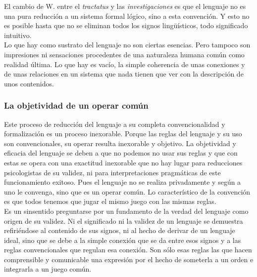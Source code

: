\documentclass[a4paper, 11pt, twocolumn, spanish]{article}
\begin{document}
El cambio de W. entre el \emph{tractatus} y las \emph{investigaciones} es que el
lenguaje no es una pura reducción a un sistema formal lógico, sino a
esta convención. Y esto no es posible hasta que no se eliminan todos
los signos lingüísticos, todo significado intuitivo.\\
Lo que hay como sustrato del lenguaje no son ciertas esencias. Pero
tampoco son impresiones ni sensaciones procedentes de una naturaleza
humana común como realidad última. Lo que hay es vacío, la simple
coherencia de unas conexiones y de unas relaciones en un sistema que
nada tienen que ver con la descripción de unos contenidos.

\subsubsection{La objetividad de un operar común}
\label{sec:orgbc5586d}
Este proceso de reducción del lenguaje a su completa convencionalidad
y formalización es un proceso inexorable. Porque las reglas del
lenguaje y su uso son convencionales, su operar resulta inexorable y
objetivo. La objetividad y eficacia del lenguaje se deben a que no
podemos no usar sus reglas y que con estas se opera con una exactitud
inexorable que no hay lugar para reducciones psicologistas de su
validez, ni para interpretaciones pragmáticas de este funcionamiento
exitoso. Pues el lenguaje no se realiza privadamente y según a uno le
convenga, sino que es un operar común. Lo característico de la
convención es que todos tenemos que jugar el mismo juego con las
mismas reglas.\\

Es un sinsentido preguntarse por un fundamento de la verdad del
lenguaje como origen de su validez. Ni el significado ni la validez de
un lenguaje se demuestra refiriéndose al contenido de sus signos, ni
al hecho de derivar de un lenguaje ideal, sino que se debe a la simple
conexión que se da entre esos signos y a las reglas convencionales que
regulan esa conexión. Son sólo esas reglas las que hacen comprensible
y comunicable una expresión por el hecho de someterla a un orden e
integrarla a un juego común.
\end{document}
